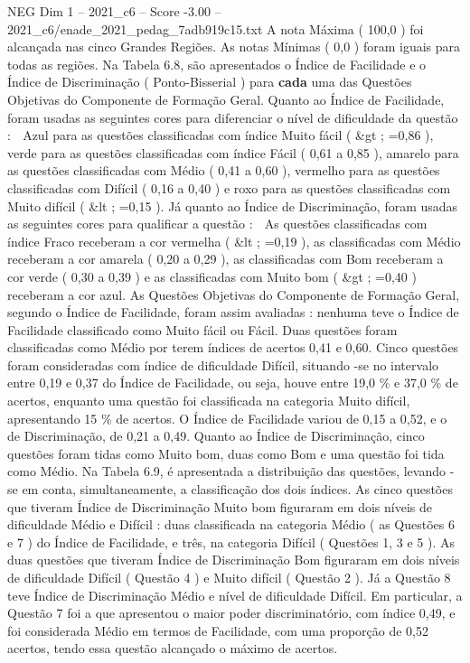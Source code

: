 \begin{textsample}{NEG Dim 1 – 2021\_c6 – Score -3.00 – 2021\_c6/enade\_2021\_pedag\_7adb919c15.txt}
A nota Máxima ( 100,0 ) foi alcançada nas cinco Grandes Regiões.
As notas Mínimas ( 0,0 ) foram iguais para todas as regiões.
Na Tabela 6.8, são apresentados o Índice de Facilidade e o Índice de Discriminação ( Ponto-Bisserial ) para \textbf{cada} uma das Questões Objetivas do Componente de Formação Geral.
Quanto ao Índice de Facilidade, foram usadas as seguintes cores para diferenciar o nível de dificuldade da questão :  Azul para as questões classificadas com índice Muito fácil ( \&gt ; =0,86 ), verde para as questões classificadas com índice Fácil ( 0,61 a 0,85 ), amarelo para as questões classificadas com Médio ( 0,41 a 0,60 ), vermelho para as questões classificadas com Difícil ( 0,16 a 0,40 ) e roxo para as questões classificadas com Muito difícil ( \&lt ; =0,15 ).
Já quanto ao Índice de Discriminação, foram usadas as seguintes cores para qualificar a questão :  As questões classificadas com índice Fraco receberam a cor vermelha ( \&lt ; =0,19 ), as classificadas com Médio receberam a cor amarela ( 0,20 a 0,29 ), as classificadas com Bom receberam a cor verde ( 0,30 a 0,39 ) e as classificadas com Muito bom ( \&gt ; =0,40 ) receberam a cor azul.
As Questões Objetivas do Componente de Formação Geral, segundo o Índice de Facilidade, foram assim avaliadas : nenhuma teve o Índice de Facilidade classificado como Muito fácil ou Fácil.
Duas questões foram classificadas como Médio por terem índices de acertos 0,41 e 0,60.
Cinco questões foram consideradas com índice de dificuldade Difícil, situando -se no intervalo entre 0,19 e 0,37 do Índice de Facilidade, ou seja, houve entre 19,0 \% e 37,0 \% de acertos, enquanto uma questão foi classificada na categoria Muito difícil, apresentando 15 \% de acertos.
O Índice de Facilidade variou de 0,15 a 0,52, e o de Discriminação, de 0,21 a 0,49.
Quanto ao Índice de Discriminação, cinco questões foram tidas como Muito bom, duas como Bom e uma questão foi tida como Médio.
Na Tabela 6.9, é apresentada a distribuição das questões, levando -se em conta, simultaneamente, a classificação dos dois índices.
As cinco questões que tiveram Índice de Discriminação Muito bom figuraram em dois níveis de dificuldade Médio e Difícil : duas classificada na categoria Médio ( as Questões 6 e 7 ) do Índice de Facilidade, e três, na categoria Difícil ( Questões 1, 3 e 5 ).
As duas questões que tiveram Índice de Discriminação Bom figuraram em dois níveis de dificuldade Difícil ( Questão 4 ) e Muito difícil ( Questão 2 ).
Já a Questão 8 teve Índice de Discriminação Médio e nível de dificuldade Difícil.
Em particular, a Questão 7 foi a que apresentou o maior poder discriminatório, com índice 0,49, e foi considerada Médio em termos de Facilidade, com uma proporção de 0,52 acertos, tendo essa questão alcançado o máximo de acertos.

\end{textsample}
